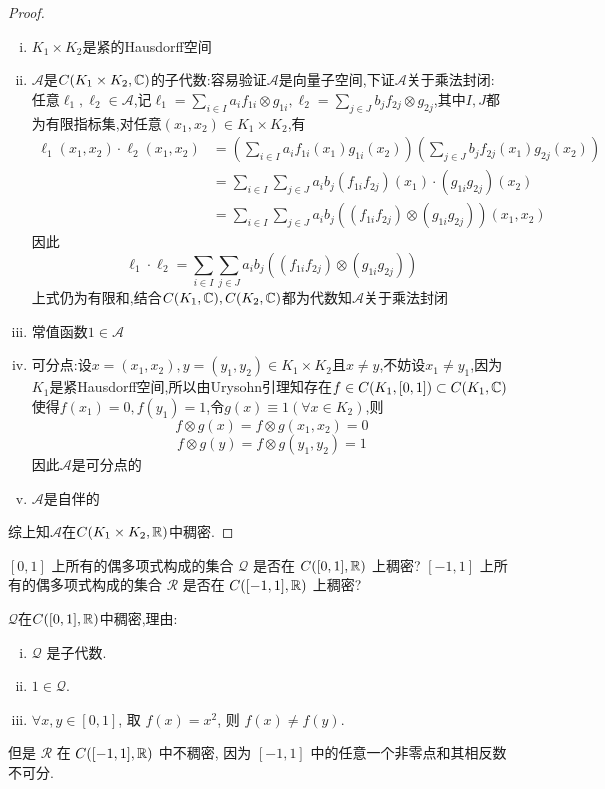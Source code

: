 \begin{proof}
    \begin{enumerate}[(i)]
    \item $K_1\times K_2$是紧的Hausdorff空间
    \item $\mathcal{A}$是$C(K_1\times K_2,\mathbb{C})$的子代数:容易验证$\mathcal{A}$是向量子空间,下证$\mathcal{A}$关于乘法封闭:\\
    任意$\ell_1,\ell_2\in\mathcal{A}$,记$\ell_1=\sum_{i\in I}a_if_{1i}\otimes g_{1i},\ell_2=\sum_{j\in J}b_jf_{2j}\otimes g_{2j}$,其中$I,J$都为有限指标集,对任意$(x_1,x_2)\in K_1\times K_2$,有\[\begin{split}\ell_1(x_1,x_2)\cdot\ell_2(x_1,x_2)&=\left(\sum_{i\in I}a_if_{1i}(x_1)g_{1i}(x_2)\right)\left(\sum_{j\in J}b_jf_{2j}(x_1)g_{2j}(x_2)\right)\\&=\sum_{i\in I}\sum_{j\in J}a_ib_j(f_{1i}f_{2j})(x_1)\cdot(g_{1i}g_{2j})(x_2)\\&=\sum_{i\in I}\sum_{j\in J}a_ib_j\left((f_{1i}f_{2j})\otimes(g_{1i}g_{2j})\right)(x_1,x_2)\end{split}\]
    因此\[\ell_1\cdot\ell_2=\sum_{i\in I}\sum_{j\in J}a_ib_j\left((f_{1i}f_{2j})\otimes(g_{1i}g_{2j})\right)\]
    上式仍为有限和,结合$C(K_1,\mathbb{C}),C(K_2,\mathbb{C})$都为代数知$\mathcal{A}$关于乘法封闭
    \item 常值函数$1\in\mathcal{A}$
    \item 可分点:设$x=(x_1,x_2),y=(y_1,y_2)\in K_1\times K_2$且$x\neq y$,不妨设$x_1\neq y_1$,因为$K_1$是紧Hausdorff空间,所以由Urysohn引理知存在$f\in C(K_1,[0,1])\subset C(K_1,\mathbb{C})$使得$f(x_1)=0,f(y_1)=1$,令$g(x)\equiv1(\forall x\in K_2)$,则
    \[f\otimes g(x)=f\otimes g(x_1,x_2)=0\]
    \[f\otimes g(y)=f\otimes g(y_1,y_2)=1\]
    因此$\mathcal{A}$是可分点的
    \item $\mathcal{A}$是自伴的
    \end{enumerate}
    综上知$\mathcal{A}$在$C(K_1\times K_2,\mathbb{R})$中稠密.
\end{proof}



\begin{exercise}
    $[0,1]$ 上所有的偶多项式构成的集合 $\mathcal{Q}$ 是否在 $C([0,1], \mathbb{R})$ 上稠密?
    $[-1,1]$ 上所有的偶多项式构成的集合 $\mathcal{R}$ 是否在 $C([-1,1], \mathbb{R})$ 上稠密?
\end{exercise}

\begin{solve}
    $\mathcal{Q}$在$C([0,1],\mathbb{R})$中稠密,理由:
    \begin{enumerate}[(i)]
    \item $\mathcal{Q}$ 是子代数.
    \item $1\in\mathcal{Q}$.
    \item $\forall x,y\in [0,1]$, 取 $f(x)=x^2$, 则 $f(x)\neq f(y)$.
    \end{enumerate}
    但是 $\mathcal{R}$ 在 $C([-1,1],\mathbb{R})$ 中不稠密, 因为 $[-1,1]$ 中的任意一个非零点和其相反数不可分.
\end{solve}



